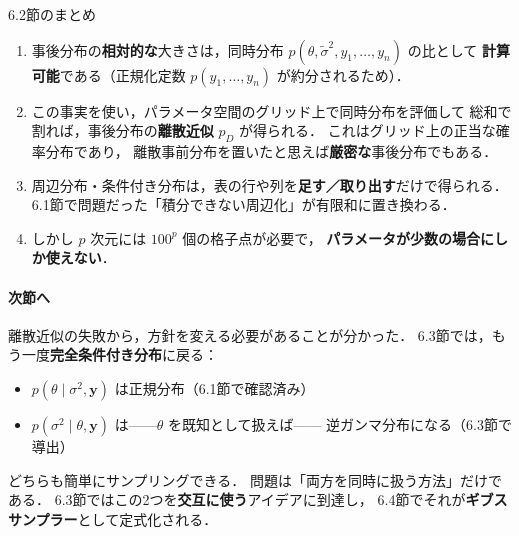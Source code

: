 \documentclass[lualatex,ja=standard,a4paper,12pt]{bxjsarticle}
\begin{document}
\begin{thmbox}{6.2節のまとめ}
\begin{enumerate}
  \item 事後分布の\textbf{相対的な}大きさは，同時分布
        $p(\theta, \tilde{\sigma}^2, y_1, \ldots, y_n)$ の比として
        \textbf{計算可能}である（正規化定数 $p(y_1,\ldots,y_n)$ が約分されるため）．

  \item この事実を使い，パラメータ空間のグリッド上で同時分布を評価して
        総和で割れば，事後分布の\textbf{離散近似} $p_D$ が得られる．
        これはグリッド上の正当な確率分布であり，
        離散事前分布を置いたと思えば\textbf{厳密な}事後分布でもある．

  \item 周辺分布・条件付き分布は，表の行や列を\textbf{足す／取り出す}だけで得られる．
        6.1節で問題だった「積分できない周辺化」が有限和に置き換わる．

  \item しかし $p$ 次元には $100^p$ 個の格子点が必要で，
        \textbf{パラメータが少数の場合にしか使えない}．
\end{enumerate}
\end{thmbox}

\paragraph{次節へ}
離散近似の失敗から，方針を変える必要があることが分かった．
6.3節では，もう一度\textbf{完全条件付き分布}に戻る：

\begin{itemize}
  \item $p(\theta \mid \sigma^2, \boldsymbol{y})$ は正規分布（6.1節で確認済み）
  \item $p(\sigma^2 \mid \theta, \boldsymbol{y})$ は——$\theta$ を既知として扱えば——
        逆ガンマ分布になる（6.3節で導出）
\end{itemize}

\noindent どちらも簡単にサンプリングできる．
問題は「両方を同時に扱う方法」だけである．
6.3節ではこの2つを\textbf{交互に使う}アイデアに到達し，
6.4節でそれが\textbf{ギブスサンプラー}として定式化される．
\end{document}
